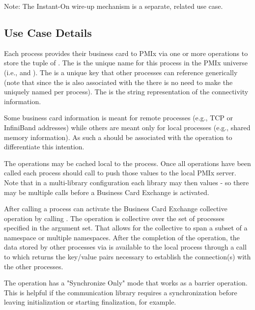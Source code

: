 Note: The Instant-On wire-up mechanism is a separate, related use case.

\subsection{Use Case Details}

Each process provides their business card to PMIx via one or more  operations to store the tuple of . The  is the unique name for this process in the \ac{PMIx} universe (i.e.,  and ). The  is a unique key that other processes can reference generically (note that since the  is also associated with the  there is no need to make the  uniquely named per process). The  is the string representation of the connectivity information.

Some business card information is meant for remote processes (e.g., TCP or InfiniBand addresses) while others are meant only for local processes (e.g., shared memory information). As such a  should be associated with the  operation to differentiate this intention.

The  operations may be cached local to the process. Once all  operations have been called each process should call  to push those values to the local PMIx server. Note that in a multi-library configuration each library may  then  values - so there may be multiple  calls before a Business Card Exchange is activated.

After calling  a process can activate the Business Card Exchange collective operation by calling . The  operation is collective over the set of processes specified in the argument set. That allows for the collective to span a subset of a namespace or multiple namespaces. After the completion of the  operation, the data stored by other processes via  is available to the local process through a call to  which returns the key/value pairs necessary to establish the connection(s) with the other processes.

The  operation has a "Synchronize Only" mode that works as a barrier operation. This is helpful if the communication library requires a synchronization before leaving initialization or starting finalization, for example.

